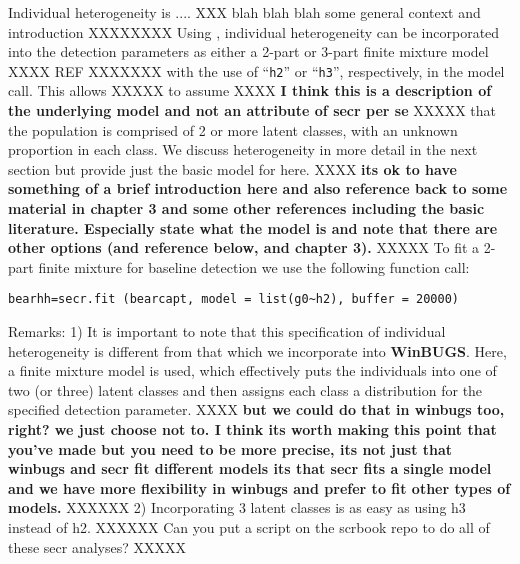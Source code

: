 Individual heterogeneity is .... XXX blah blah blah some general
context and introduction XXXXXXXX
Using \secr,  individual heterogeneity can be incorporated
into the detection parameters as either a 2-part or 3-part finite
mixture model XXXX REF XXXXXXX with the use of ``\mbox{\tt h2}'' or
``\mbox{\tt h3}'', respectively, in the
model call.   This allows  XXXXX to assume  XXXX
{\bf I
think this is a description of the underlying model and not an
attribute of secr per se} XXXXX that the population is
comprised of 2 or more latent classes, with an unknown proportion in
each class.  We discuss heterogeneity in more detail in the next
section but provide just the basic model for \secr here.
XXXX
{\bf its ok
to have something of a brief introduction here and also reference back
to some material in chapter 3 and some other references including the
basic literature. Especially state what the model is and note that
there are other options (and reference below, and chapter 3). }
XXXXX
To fit a
2-part finite mixture for baseline detection we use the following
function call:

\begin{verbatim}
bearhh=secr.fit (bearcapt, model = list(g0~h2), buffer = 20000)
\end{verbatim}

Remarks:  1) It is important to note that this specification of
individual heterogeneity is different from that which we incorporate
into \textbf{WinBUGS}.  Here, a finite mixture model is used, which effectively
puts the individuals into one of two (or three) latent classes and
then assigns each class a distribution for the specified detection
parameter. XXXX
{\bf but we could do that in winbugs too, right? we just
choose not to. I think its worth making this point that you've made
but you need to be more precise, its not just that winbugs and secr
fit different models its that secr fits a single model and we have
more flexibility in winbugs and prefer to fit other types of models.}
XXXXXX
  2) Incorporating 3 latent classes is as easy as using h3
instead of h2.  XXXXXX Can you put a script on the scrbook repo to do
all of these secr analyses? XXXXX
\begin{comment}
XXXXX if we have exercises in the book we'll put these at the end.
 For homework, the reader should incorporate
heterogeneity in sigma and using 2 and 3 classes.   Take note of any
warning messages or errors.
\end{comment}



